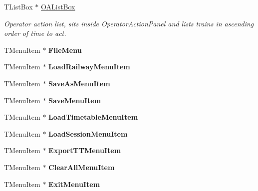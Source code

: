 \begin{DoxyCompactItemize}
T\+List\+Box $\ast$ \mbox{\hyperlink{class_t_interface_a06c02506913fc9d0fe5f13c4950ff99f}{O\+A\+List\+Box}}
\begin{DoxyCompactList}\small\item\em Operator action list, sits inside Operator\+Action\+Panel and lists trains in ascending order of time to act. \end{DoxyCompactList}\item 
\mbox{\label{class_t_interface_a60596fc589806809a947f92681a0eb76}} 
T\+Menu\+Item $\ast$ {\bfseries File\+Menu}
\item 
\mbox{\label{class_t_interface_a9a18bcb63978a68899e33d5650d1b0d1}} 
T\+Menu\+Item $\ast$ {\bfseries Load\+Railway\+Menu\+Item}
\item 
\mbox{\label{class_t_interface_aba64b040556635901c62e90177ae077d}} 
T\+Menu\+Item $\ast$ {\bfseries Save\+As\+Menu\+Item}
\item 
\mbox{\label{class_t_interface_a5cfb2e50d6b0a7c80e665076ed824bf7}} 
T\+Menu\+Item $\ast$ {\bfseries Save\+Menu\+Item}
\item 
\mbox{\label{class_t_interface_a8bdebb5d77cd0866470536cc6608083c}} 
T\+Menu\+Item $\ast$ {\bfseries Load\+Timetable\+Menu\+Item}
\item 
\mbox{\label{class_t_interface_aa62edd983f6ff1f2d0d68f48c6aaeda0}} 
T\+Menu\+Item $\ast$ {\bfseries Load\+Session\+Menu\+Item}
\item 
\mbox{\label{class_t_interface_a81b00a53a2e0591baf3589bb4c5b3793}} 
T\+Menu\+Item $\ast$ {\bfseries Export\+T\+T\+Menu\+Item}
\item 
\mbox{\label{class_t_interface_afd79ba734c2b134f0279b72d6606db22}} 
T\+Menu\+Item $\ast$ {\bfseries Clear\+All\+Menu\+Item}
\item 
\mbox{\label{class_t_interface_a9e147ffa9214458e6ea4838748da9a63}} 
T\+Menu\+Item $\ast$ {\bfseries Exit\+Menu\+Item}
\item 
\mbox{\label{class_t_interface_acd9d9b1f2e9f370f2e36d21dba083a61}} 

\end{DoxyCompactItemize}
